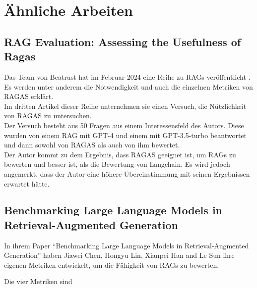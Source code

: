\chapter{Ähnliche Arbeiten}

\section{RAG Evaluation: Assessing the Usefulness of Ragas}
Das Team von Beatrust hat im Februar 2024 eine Reihe zu RAGs veröffentlicht \cite{beatrust_ragas_2024}. Es werden unter anderem die Notwendigkeit und auch die einzelnen Metriken von RAGAS erklärt.\\
Im dritten Artikel dieser Reihe unternehmen sie einen Versuch, die Nützlichkeit von RAGAS zu untersuchen.\\
Der Versuch besteht aus 50 Fragen aus einem Interessensfeld des Autors. Diese wurden von einem RAG mit GPT-4 und einem mit GPT-3.5-turbo beantwortet und dann sowohl von RAGAS als auch von ihm bewertet.\\
Der Autor kommt zu dem Ergebnis, dass RAGAS geeignet ist, um RAGs zu bewerten und besser ist, als die Bewertung von Langchain. Es wird jedoch angemerkt, dass der Autor eine höhere Übereinstimmung mit seinen Ergebnissen erwartet hätte.



\section{Benchmarking Large Language Models in Retrieval-Augmented Generation}
In ihrem Paper \enquote{Benchmarking Large Language Models in Retrieval-Augmented Generation}\cite{Chen2023BenchmarkingLL} haben Jiawei Chen, Hongyu Lin, Xianpei Han and Le Sun ihre eigenen Metriken entwickelt, um die Fähigkeit von RAGs zu bewerten.

Die vier Metriken sind

